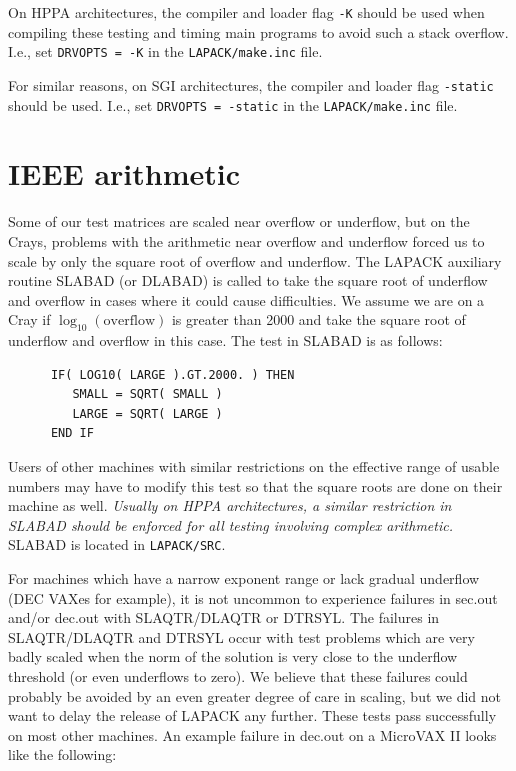\documentclass[11pt]{report}
\begin{document}
On HPPA architectures, the 
compiler and loader flag \texttt{-K} should be used when compiling these testing
and timing main programs to avoid such a stack overflow.  I.e., set
\texttt{DRVOPTS = -K} in the \texttt{LAPACK/make.inc} file.

For similar reasons,
on SGI architectures, the compiler and loader flag \texttt{-static} should be
used.  I.e., set \texttt{DRVOPTS = -static} in the \texttt{LAPACK/make.inc} file.

\section{IEEE arithmetic}

Some of our test matrices are scaled near overflow or underflow,
but on the Crays, problems with the arithmetic near overflow and
underflow forced us to scale by only the square root of overflow
and underflow.
The LAPACK auxiliary routine SLABAD (or DLABAD) is called to
take the square root of underflow and overflow in cases where it
could cause difficulties.
We assume we are on a Cray if $ \log_{10} (\mathrm{overflow})$
is greater than 2000
and take the square root of underflow and overflow in this case.
The test in SLABAD is as follows:
\begin{verbatim}
      IF( LOG10( LARGE ).GT.2000. ) THEN
         SMALL = SQRT( SMALL )
         LARGE = SQRT( LARGE )
      END IF
\end{verbatim}
Users of other machines with similar restrictions on the effective
range of usable numbers may have to modify this test so that the
square roots are done on their machine as well.  \emph{Usually on
HPPA architectures, a similar restriction in SLABAD should be enforced
for all testing involving complex arithmetic.}
SLABAD is located in \texttt{LAPACK/SRC}.

For machines which have a narrow exponent range or lack gradual
underflow (DEC VAXes for example), it is not uncommon to experience
failures in sec.out and/or dec.out with SLAQTR/DLAQTR or DTRSYL.
The failures in SLAQTR/DLAQTR and DTRSYL
occur with test problems which are very badly scaled when the norm of
the solution is very close to the underflow
threshold (or even underflows to zero).  We believe that these failures
could probably be avoided by an even greater degree of care in scaling,
but we did not want to delay the release of LAPACK any further.  These
tests pass successfully on most other machines.  An example failure in
dec.out on a MicroVAX II looks like the following:
\end{document}
